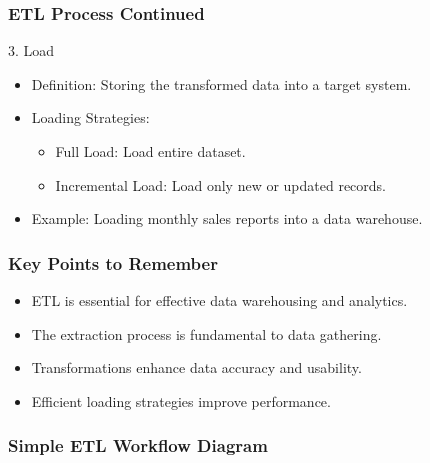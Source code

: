 \documentclass[aspectratio=169]{beamer}
\begin{document}
\begin{frame}[fragile]
    \frametitle{ETL Process Continued}
    \begin{block}{3. Load}
        \begin{itemize}
            \item Definition: Storing the transformed data into a target system.
            \item Loading Strategies:
                \begin{itemize}
                    \item Full Load: Load entire dataset.
                    \item Incremental Load: Load only new or updated records.
                \end{itemize}
            \item Example: Loading monthly sales reports into a data warehouse.
        \end{itemize}
    \end{block}
\end{frame}

\begin{frame}[fragile]
    \frametitle{Key Points to Remember}
    \begin{itemize}
        \item ETL is essential for effective data warehousing and analytics.
        \item The extraction process is fundamental to data gathering.
        \item Transformations enhance data accuracy and usability.
        \item Efficient loading strategies improve performance.
    \end{itemize}
\end{frame}

\begin{frame}[fragile]
    \frametitle{Simple ETL Workflow Diagram}
    \centering
\end{frame}
\end{document}
